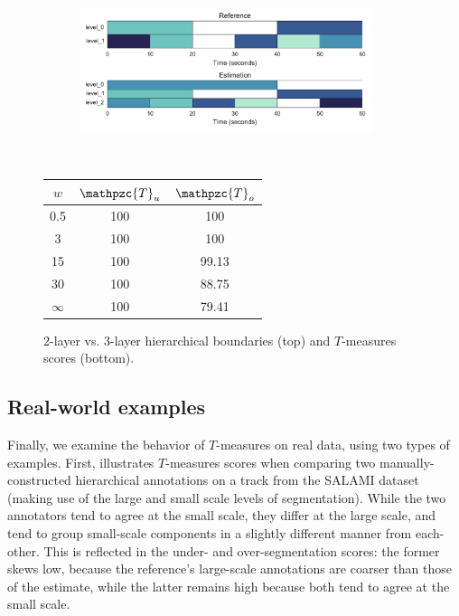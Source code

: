 \documentclass{article}
\def\shag{\ensuremath{\mathpzc{T}}}
\begin{document}
\begin{figure}[t]
  \centering
  \begin{subfigure}{0.5\textwidth}
    \centering
    \includegraphics[width=0.94\textwidth]{figs/hier-hiercomp.pdf}
  \end{subfigure}%
  \\
  \begin{minipage}{0.5\textwidth}
    \centering
    \vspace{10pt}
    \begin{tabular}{|c|c|c|}
      \hline
      $w$       & $\shag_u$       & $\shag_o$      \\
      \hline
      0.5       & 100       & 100      \\     
      3         & 100       & 100      \\
      15        & 100       & 99.13    \\
      30        & 100       & 88.75    \\
      $\infty$  & 100       & 79.41    \\
      \hline
    \end{tabular}
  \end{minipage}
  \caption{2-layer vs. 3-layer hierarchical boundaries (top) and $T$-measures scores (bottom).}
  \label{fig:hier-hiercomp}
\end{figure}


\subsection{Real-world examples}
Finally, we examine the behavior of $T$-measures on real data, using two types of examples.
First,  illustrates $T$-measures scores when comparing two manually-constructed hierarchical annotations on a track from the SALAMI dataset (making use of the large and small scale levels of segmentation).
While the two annotators tend to agree at the small scale, they differ at the large scale, and tend to group small-scale components in a slightly different manner from each-other.
This is reflected in the under- and over-segmentation scores: the former skews low, because the reference's large-scale annotations are coarser than those of the estimate, while the latter remains high because both tend to agree at the small scale.
\end{document}

